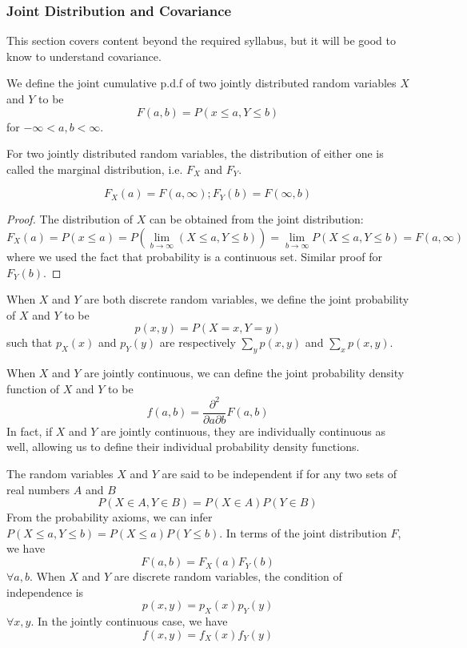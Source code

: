 \documentclass[a4paper]{article}
\begin{document}
\subsubsection*{Joint Distribution and Covariance~\cite{ross2010first}}
This section covers content beyond the required syllabus, but it will be good to know to understand covariance.
\begin{defi}
We define the joint cumulative p.d.f of two jointly distributed random variables $X$ and $Y$ to be
$$F(a,b)=P(x\leq a,Y\leq b)$$
for $-\infty<a,b<\infty$.
\end{defi}
\begin{defi}
For two jointly distributed random variables, the distribution of either one is called the marginal distribution, i.e. $F_X$ and $F_Y$.
\end{defi}
\begin{thm}
$$F_X(a)=F(a,\infty);F_Y(b)=F(\infty,b)$$
\end{thm}
\begin{proof}
The distribution of $X$ can be obtained from the joint distribution:
$$F_X(a)=P(x\leq a)=P(\lim_{b\rightarrow\infty}(X\leq a,Y\leq b))=\lim_{b\rightarrow\infty}P(X\leq a,Y\leq b)=F(a,\infty)$$
where we used the fact that probability is a continuous set. Similar proof for $F_Y(b)$.
\end{proof}
\begin{defi}
When $X$ and $Y$ are both discrete random variables, we  define the joint probability of $X$ and $Y$ to be
$$p(x,y)=P(X=x,Y=y)$$
such that $p_X(x)$ and $p_Y(y)$ are respectively $\sum_{y}p(x,y)$ and $\sum_xp(x,y)$.
\end{defi}
\begin{defi}
When $X$ and $Y$ are jointly continuous, we can define the joint probability density function of $X$ and $Y$ to be
$$f(a,b)=\frac{\partial^2}{\partial a\partial b}F(a,b)$$
In fact, if $X$ and $Y$ are jointly continuous, they are individually continuous as well, allowing us to define their individual probability density functions.
\end{defi}
\begin{defi}
The random variables $X$ and $Y$ are said to be independent if for any two sets of real numbers $A$ and $B$
$$P(X\in A,Y\in B)=P(X\in A)P(Y\in B)$$
From the probability axioms, we can infer $P(X\leq a,Y\leq b)=P(X\leq a)P(Y\leq b)$. In terms of the joint distribution $F$, we have
$$F(a,b)=F_X(a)F_Y(b)$$
$\forall a,b$.
When $X$ and $Y$ are discrete random variables, the condition of independence is
$$p(x,y)=p_X(x)p_Y(y)$$
$\forall x,y$. In the jointly continuous case, we have
$$f(x,y)=f_X(x)f_Y(y)$$
\end{defi}
\end{document}
